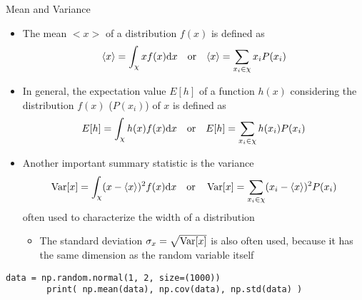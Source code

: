   \begin{frame}[fragile]{Mean and Variance}
    \begin{itemize}
      \item The mean $<x>$ of a distribution $f(x)$ is defined as
        \begin{equation*}
          \langle x\rangle = \int_\chi xf(x) \mathrm{d}x
          \quad\text{or}\quad
          \langle x\rangle = \sum_{x_i\in\chi} x_iP(x_i)
        \end{equation*}
      \item In general, the expectation value $E[h]$ of a function $h(x)$ considering the distribution $f(x)$ ($P(x_i)$) of $x$ is defined as
        \begin{equation*}
          E[h] = \int_\chi h(x)f(x) \mathrm{d}x
          \quad\text{or}\quad
          E[h] = \sum_{x_i\in\chi} h(x_i)P(x_i)
        \end{equation*}
      \item Another important summary statistic is the variance
        \begin{equation*}
          \operatorname{Var}[x] = \int_\chi (x-\langle x\rangle)^2 f(x) \mathrm{d}x
          \quad\text{or}\quad
          \operatorname{Var}[x] = \sum_{x_i\in\chi} (x_i - \langle x\rangle)^2 P(x_i)
        \end{equation*}
        often used to characterize the width of a distribution
        \begin{itemize}
          \item The standard deviation $\sigma_x = \sqrt{\operatorname{Var}[x]}$ is also often used, because it has the same dimension as the random variable itself
        \end{itemize}
    \end{itemize}
    \begin{mdframed}
      \begin{lstlisting}[style=dark, gobble=8, title=\lsttitlelight{Cumulative distribution function for discrete PDF}]
        data = np.random.normal(1, 2, size=(1000))
        print( np.mean(data), np.cov(data), np.std(data) )
      \end{lstlisting}
    \end{mdframed}
  \end{frame}

